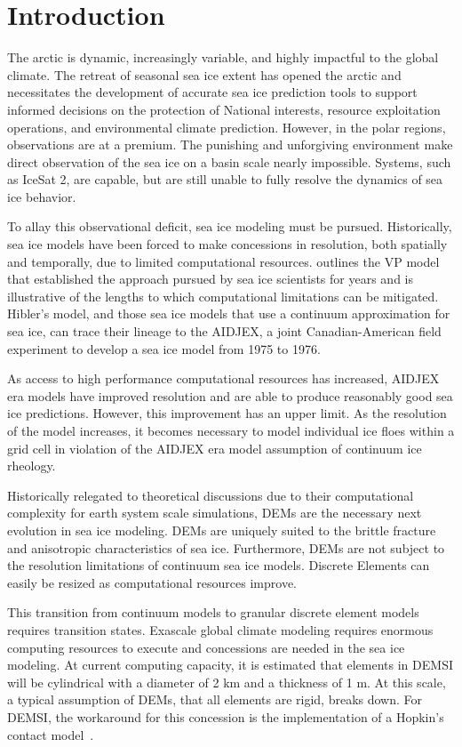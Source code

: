 \chapter{Introduction}\label{ch:Introduction}
The arctic is dynamic, increasingly variable, and highly impactful to the global climate.  The retreat of seasonal sea ice extent has opened the arctic and necessitates the development of accurate sea ice prediction tools to support informed decisions on the protection of National interests, resource exploitation operations, and environmental climate prediction.  However, in the polar regions, observations are at a premium.  The punishing and unforgiving environment make direct observation of the sea ice on a basin scale nearly impossible.  Systems, such as IceSat 2, are capable, but are still unable to fully resolve the dynamics of sea ice behavior.

To allay this observational deficit, sea ice modeling must be pursued.  Historically, sea ice models have been forced to make concessions in resolution, both spatially and temporally, due to limited computational resources.  \cite{Hibler1979} outlines the \ac{VP} model that established the approach pursued by sea ice scientists for years and is illustrative of the lengths to which computational limitations can be mitigated.  Hibler's model, and those sea ice models that use a continuum approximation for sea ice, can trace their lineage to the \ac{AIDJEX}, a joint Canadian-American field experiment to develop a sea ice model from 1975 to 1976.

As access to high performance computational resources has increased, \ac{AIDJEX} era models have improved resolution and are able to produce reasonably good sea ice predictions.  However, this improvement has an upper limit.  As the resolution of the model increases, it becomes necessary to model individual ice floes within a grid cell in violation of the \ac{AIDJEX} era model assumption of continuum ice rheology.

Historically relegated to theoretical discussions due to their computational complexity for earth system scale simulations, \acp{DEM} are the necessary next evolution in sea ice modeling.  \acp{DEM} are uniquely suited to the brittle fracture and anisotropic characteristics of sea ice.  Furthermore, \acp{DEM} are not subject to the resolution limitations of continuum sea ice models.  Discrete Elements can easily be resized as computational resources improve.

This transition from continuum models to granular discrete element models requires transition states.  Exascale global climate modeling requires enormous computing resources to execute and concessions are needed in the sea ice modeling.  At current computing capacity, it is estimated that elements in \ac{DEMSI} will be cylindrical with a diameter of 2 km and a thickness of 1 m.  At this scale, a typical assumption of \acp{DEM}, that all elements are rigid, breaks down.  For \ac{DEMSI}, the workaround for this concession is the implementation of a Hopkin's contact model~\citet{Hopkins1996}.


